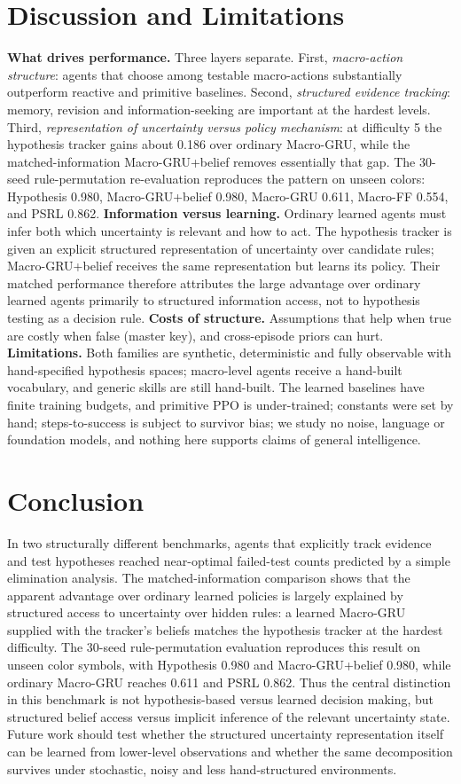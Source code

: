 \documentclass[runningheads]{llncs}
\begin{document}
{{\section{Discussion and Limitations}
\textbf{What drives performance.} Three layers separate. First, \emph{macro-action structure}: agents that choose among testable macro-actions substantially outperform reactive and primitive baselines. Second, \emph{structured evidence tracking}: memory, revision and information-seeking are important at the hardest levels. Third, \emph{representation of uncertainty versus policy mechanism}: at difficulty 5 the hypothesis tracker gains about 0.186 over ordinary Macro-GRU, while the matched-information Macro-GRU+belief removes essentially that gap. The 30-seed rule-permutation re-evaluation reproduces the pattern on unseen colors: Hypothesis 0.980, Macro-GRU+belief 0.980, Macro-GRU 0.611, Macro-FF 0.554, and PSRL 0.862. \textbf{Information versus learning.} Ordinary learned agents must infer both which uncertainty is relevant and how to act. The hypothesis tracker is given an explicit structured representation of uncertainty over candidate rules; Macro-GRU+belief receives the same representation but learns its policy. Their matched performance therefore attributes the large advantage over ordinary learned agents primarily to structured information access, not to hypothesis testing as a decision rule. \textbf{Costs of structure.} Assumptions that help when true are costly when false (master key), and cross-episode priors can hurt. \textbf{Limitations.} Both families are synthetic, deterministic and fully observable with hand-specified hypothesis spaces; macro-level agents receive a hand-built vocabulary, and generic skills are still hand-built. The learned baselines have finite training budgets, and primitive PPO is under-trained; constants were set by hand; steps-to-success is subject to survivor bias; we study no noise, language or foundation models, and nothing here supports claims of general intelligence.

\section{Conclusion}
In two structurally different benchmarks, agents that explicitly track evidence and test hypotheses reached near-optimal failed-test counts predicted by a simple elimination analysis. The matched-information comparison shows that the apparent advantage over ordinary learned policies is largely explained by structured access to uncertainty over hidden rules: a learned Macro-GRU supplied with the tracker's beliefs matches the hypothesis tracker at the hardest difficulty. The 30-seed rule-permutation evaluation reproduces this result on unseen color symbols, with Hypothesis 0.980 and Macro-GRU+belief 0.980, while ordinary Macro-GRU reaches 0.611 and PSRL 0.862. Thus the central distinction in this benchmark is not hypothesis-based versus learned decision making, but structured belief access versus implicit inference of the relevant uncertainty state. Future work should test whether the structured uncertainty representation itself can be learned from lower-level observations and whether the same decomposition survives under stochastic, noisy and less hand-structured environments.

}}
\end{document}
